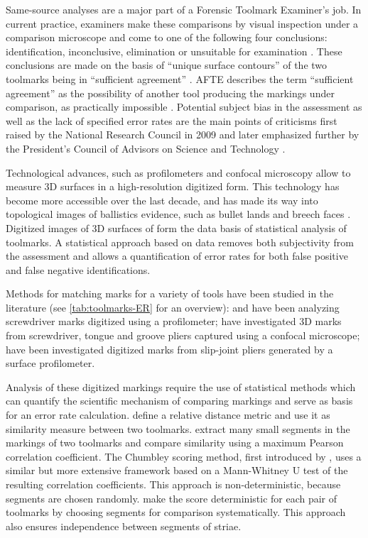 \documentclass[12pt]{article}
\begin{document}
Same-source analyses are a major part of a Forensic Toolmark Examiner's
job. In current practice, examiners make these comparisons by visual
inspection under a comparison microscope and come to one of the
following four conclusions: identification, inconclusive, elimination or
unsuitable for examination \citep{afte-toolmarks1998}. These conclusions
are made on the basis of ``unique surface contours'' of the two
toolmarks being in ``sufficient agreement'' \citep{afte-toolmarks1998}.
AFTE describes the term ``sufficient agreement'' as the possibility of
another tool producing the markings under comparison, as practically
impossible \citep{afte-toolmarks1998}. Potential subject bias in the
assessment as well as the lack of specified error rates are the main
points of criticisms first raised by the National Research Council in
2009 \citep{NAS:2009} and later emphasized further by the President's
Council of Advisors on Science and Technology \citep{pcast2016}.

Technological advances, such as profilometers and confocal microscopy
allow to measure 3D surfaces in a high-resolution digitized form. This
technology has become more accessible over the last decade, and has made
its way into topological images of ballistics evidence, such as bullet
lands and breech faces
\citep{DeKinder1, DeKinder2, Bachrach1, vorburger2016}. Digitized images
of 3D surfaces of form the data basis of statistical analysis of
toolmarks. A statistical approach based on data removes both
subjectivity from the assessment and allows a quantification of error
rates for both false positive and false negative identifications.

Methods for matching marks for a variety of tools have been studied in
the literature (see \autoref{tab:toolmarks-ER} for an overview):
\citet{manytoolmarks1} and \citet{chumbley} have been analyzing
screwdriver marks digitized using a profilometer; \citet{manytoolmarks2}
have investigated 3D marks from screwdriver, tongue and groove pliers
captured using a confocal microscope; \citet{afte-chumbley} have been
investigated digitized marks from slip-joint pliers generated by a
surface profilometer.

Analysis of these digitized markings require the use of statistical
methods which can quantify the scientific mechanism of comparing
markings and serve as basis for an error rate calculation.
\citet{manytoolmarks2} define a relative distance metric and use it as
similarity measure between two toolmarks. \citet{manytoolmarks1} extract
many small segments in the markings of two toolmarks and compare
similarity using a maximum Pearson correlation coefficient. The Chumbley
scoring method, first introduced by \citet{chumbley}, uses a similar but
more extensive framework based on a Mann-Whitney U test of the resulting
correlation coefficients. This approach is non-deterministic, because
segments are chosen randomly. \citep{hadler} make the score
deterministic for each pair of toolmarks by choosing segments for
comparison systematically. This approach also ensures independence
between segments of striae.
\end{document}
